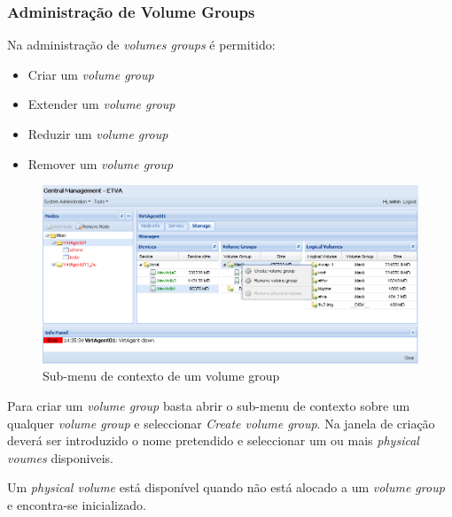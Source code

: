 \subsubsection{Administração de Volume Groups}
Na administração de \emph{volumes groups} é permitido:
\begin{itemize}
	\item Criar um \emph{volume group}
	\item Extender um \emph{volume group}
	\item Reduzir um \emph{volume group}
	\item Remover um \emph{volume group}
\end{itemize}

\begin{figure}[H]
        \begin{center}
        \includegraphics[scale=0.5]{screenshots/node_storage_vg_ctx.png}
        \caption{Sub-menu de contexto de um volume group}
        \label{fig:storage_vg_ctx}
        \end{center}
\end{figure}

Para criar um \emph{volume group} basta abrir o sub-menu de contexto sobre um qualquer \emph{volume group} e seleccionar \emph{Create volume group}.
Na janela de criação deverá ser introduzido o nome pretendido e seleccionar um ou mais \emph{physical voumes} disponiveis.

Um \emph{physical volume} está disponível quando não está alocado a um \emph{volume group} e encontra-se inicializado.

